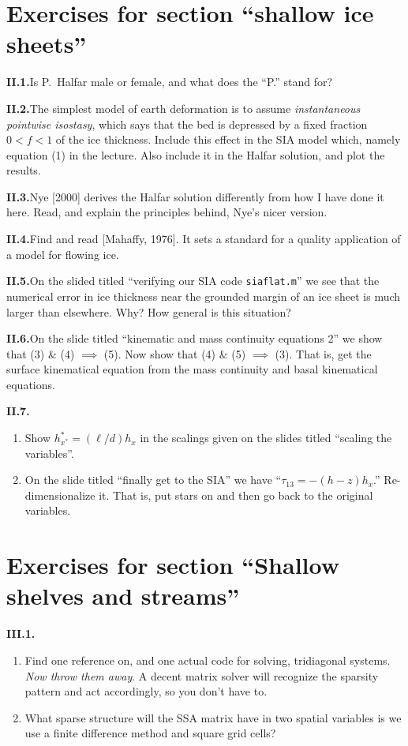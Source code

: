 \documentclass[11pt,final]{amsart}
\newcommand{\exer}[2]{\medskip\noindent \textbf{#1.}\quad #2}
\begin{document}
\bigskip
\section*{Exercises for section ``shallow ice sheets''}

\exer{II.1}{Is P.~Halfar male or female, and what does the ``P.'' stand for?}

\exer{II.2}{The simplest model of earth deformation is to assume \emph{instantaneous pointwise isostasy}, which says that the bed is depressed by a fixed fraction $0<f<1$ of the ice thickness.  Include this effect in the SIA model which, namely equation (1) in the lecture.  Also include it in the Halfar solution, and plot the results.}

\exer{II.3}{Nye [2000] derives the Halfar solution differently from how I have done it here.  Read, and explain the principles behind, Nye's nicer version.}

\exer{II.4}{Find and read [Mahaffy, 1976].  It sets a standard for a quality application of a model for flowing ice.}

\exer{II.5}{On the slided titled ``verifying our SIA code \texttt{siaflat.m}'' we see that the numerical error in ice thickness near the grounded margin of an ice sheet is much larger than elsewhere.  Why?  How general is this situation?}

\exer{II.6}{On the slide titled ``kinematic and mass continuity equations 2'' we show that (3) \& (4) $\implies$ (5).  Now show that (4) \& (5) $\implies$ (3).  That is, get the surface kinematical equation from the mass continuity and basal kinematical equations.}

\exer{II.7}{
\renewcommand{\labelenumi}{(\alph{enumi})}
\begin{enumerate}
\item Show $h^*_{x^*} = (\ell/d) h_x$ in the scalings given on the slides titled ``scaling the variables''.
\item On the slide titled ``finally get to the SIA'' we have ``$\tau_{13} = - (h - z) h_x$.''  Re-dimensionalize it.  That is, put stars on and then go back to the original variables.
\end{enumerate}
}


\bigskip
\section*{Exercises for section ``Shallow shelves and streams''}

\exer{III.1}{\renewcommand{\labelenumi}{(\alph{enumi})}
\begin{enumerate}
\item Find one reference on, and one actual code for solving, tridiagonal systems. \emph{Now throw them away}.  A decent matrix solver will recognize the sparsity pattern and act accordingly, so you don't have to.
\item What sparse structure will the SSA matrix have in two spatial variables is we use a finite difference method and square grid cells?
\end{enumerate}}
\end{document}
